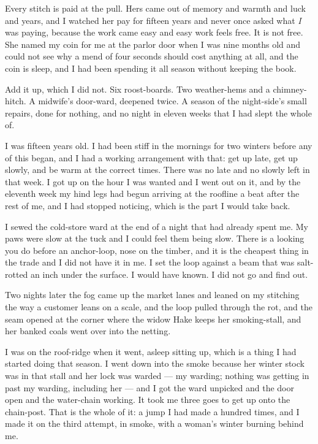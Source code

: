 Every stitch is paid at the pull. Hers came out of memory and warmth and luck and years, and I watched her pay for fifteen years and never once asked what \emph{I} was paying, because the work came easy and easy work feels free. It is not free. She named my coin for me at the parlor door when I was nine months old and could not see why a mend of four seconds should cost anything at all, and the coin is sleep, and I had been spending it all season without keeping the book.

Add it up, which I did not. Six roost-boards. Two weather-hems and a chimney-hitch. A midwife's door-ward, deepened twice. A season of the night-side's small repairs, done for nothing, and no night in eleven weeks that I had slept the whole of.

I was fifteen years old. I had been stiff in the mornings for two winters before any of this began, and I had a working arrangement with that: get up late, get up slowly, and be warm at the correct times. There was no late and no slowly left in that week. I got up on the hour I was wanted and I went out on it, and by the eleventh week my hind legs had begun arriving at the roofline a beat after the rest of me, and I had stopped noticing, which is the part I would take back.

I sewed the cold-store ward at the end of a night that had already spent me. My paws were slow at the tuck and I could feel them being slow. There is a looking you do before an anchor-loop, nose on the timber, and it is the cheapest thing in the trade and I did not have it in me. I set the loop against a beam that was salt-rotted an inch under the surface. I would have known. I did not go and find out.

Two nights later the fog came up the market lanes and leaned on my stitching the way a customer leans on a scale, and the loop pulled through the rot, and the seam opened at the corner where the widow Hake keeps her smoking-stall, and her banked coals went over into the netting.

I was on the roof-ridge when it went, asleep sitting up, which is a thing I had started doing that season. I went down into the smoke because her winter stock was in that stall and her lock was warded --- my warding; nothing was getting in past my warding, including her --- and I got the ward unpicked and the door open and the water-chain working. It took me three goes to get up onto the chain-post. That is the whole of it: a jump I had made a hundred times, and I made it on the third attempt, in smoke, with a woman's winter burning behind me.

